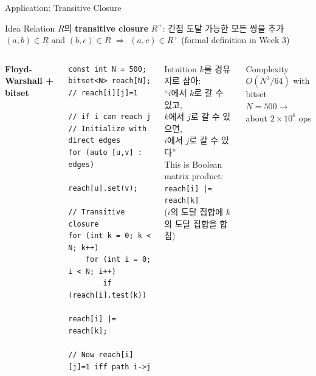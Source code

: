\documentclass{beamer}
\begin{document}
\begin{frame}[fragile,shrink=5]{Application: Transitive Closure}
    \small
    \vspace{0.1cm}
    \begin{block}{Idea}
        \footnotesize
        Relation $R$의 \textbf{transitive closure} $R^+$: 간접 도달 가능한 모든 쌍을 추가\\[3pt]
        $(a,b) \in R$ and $(b,c) \in R$ $\Rightarrow$ $(a,c) \in R^+$ \quad (formal definition in Week 3)
    \end{block}

    \vspace{0.08cm}
    \begin{columns}[T]
        \textbf{Floyd-Warshall + bitset}
\begin{lstlisting}[style=cpp]
const int N = 500;
bitset<N> reach[N]; // reach[i][j]=1
                    // if i can reach j
// Initialize with direct edges
for (auto [u,v] : edges)
    reach[u].set(v);

// Transitive closure
for (int k = 0; k < N; k++)
    for (int i = 0; i < N; i++)
        if (reach[i].test(k))
            reach[i] |= reach[k];

// Now reach[i][j]=1 iff path i->j
\end{lstlisting}

        \begin{exampleblock}{Intuition}
            \footnotesize
            $k$를 경유지로 삼아:\\
            ``$i$에서 $k$로 갈 수 있고,\\
            $k$에서 $j$로 갈 수 있으면,\\
            $i$에서 $j$로 갈 수 있다''\\[6pt]
            This is Boolean matrix product:\\
            \texttt{reach[i] |= reach[k]}\\
            ($i$의 도달 집합에 $k$의 도달 집합을 합침)
        \end{exampleblock}

        \vspace{0.1cm}
        \begin{alertblock}{\scriptsize Complexity}
            \scriptsize $O(N^3 / 64)$ with bitset\\
            $N = 500 \to$ about $2 \times 10^6$ ops
        \end{alertblock}
    \end{columns}
\end{frame}
\end{document}
